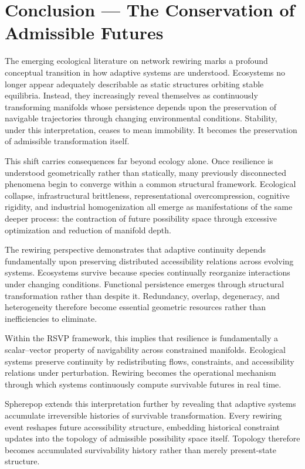 \documentclass[11pt,a4paper]{article}
\begin{document}
\newpage

\section{Conclusion --- The Conservation of Admissible Futures}

The emerging ecological literature on network rewiring marks a profound conceptual transition in how adaptive systems are understood. Ecosystems no longer appear adequately describable as static structures orbiting stable equilibria. Instead, they increasingly reveal themselves as continuously transforming manifolds whose persistence depends upon the preservation of navigable trajectories through changing environmental conditions. Stability, under this interpretation, ceases to mean immobility. It becomes the preservation of admissible transformation itself.

This shift carries consequences far beyond ecology alone. Once resilience is understood geometrically rather than statically, many previously disconnected phenomena begin to converge within a common structural framework. Ecological collapse, infrastructural brittleness, representational overcompression, cognitive rigidity, and industrial homogenization all emerge as manifestations of the same deeper process: the contraction of future possibility space through excessive optimization and reduction of manifold depth.

The rewiring perspective demonstrates that adaptive continuity depends fundamentally upon preserving distributed accessibility relations across evolving systems. Ecosystems survive because species continually reorganize interactions under changing conditions. Functional persistence emerges through structural transformation rather than despite it. Redundancy, overlap, degeneracy, and heterogeneity therefore become essential geometric resources rather than inefficiencies to eliminate.

Within the RSVP framework, this implies that resilience is fundamentally a scalar--vector property of navigability across constrained manifolds. Ecological systems preserve continuity by redistributing flows, constraints, and accessibility relations under perturbation. Rewiring becomes the operational mechanism through which systems continuously compute survivable futures in real time.

Spherepop extends this interpretation further by revealing that adaptive systems accumulate irreversible histories of survivable transformation. Every rewiring event reshapes future accessibility structure, embedding historical constraint updates into the topology of admissible possibility space itself. Topology therefore becomes accumulated survivability history rather than merely present-state structure.
\end{document}
